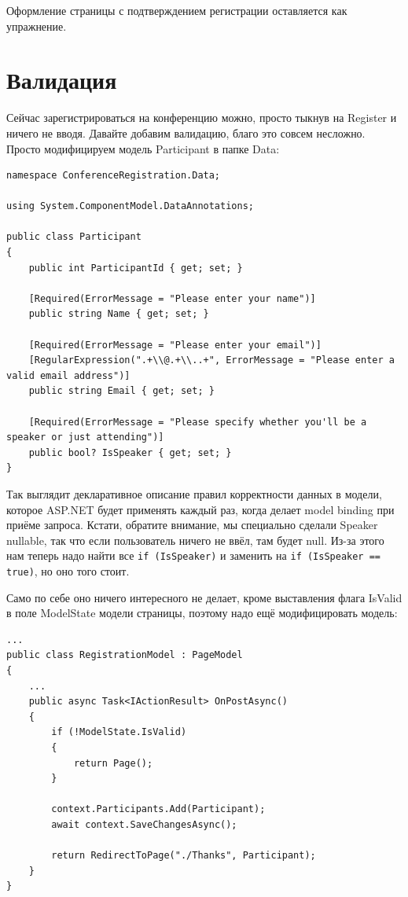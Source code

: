 \documentclass{../../text-style}
\begin{document}
Оформление страницы с подтверждением регистрации оставляется как упражнение.

\section{Валидация}

Сейчас зарегистрироваться на конференцию можно, просто тыкнув на Register и ничего не вводя. Давайте добавим валидацию, благо это совсем несложно. Просто модифицируем модель Participant в папке Data:

\begin{verbatim}
namespace ConferenceRegistration.Data;

using System.ComponentModel.DataAnnotations;

public class Participant
{
    public int ParticipantId { get; set; }

    [Required(ErrorMessage = "Please enter your name")]
    public string Name { get; set; }

    [Required(ErrorMessage = "Please enter your email")]
    [RegularExpression(".+\\@.+\\..+", ErrorMessage = "Please enter a valid email address")]
    public string Email { get; set; }

    [Required(ErrorMessage = "Please specify whether you'll be a speaker or just attending")]
    public bool? IsSpeaker { get; set; }
}
\end{verbatim}

Так выглядит декларативное описание правил корректности данных в модели, которое ASP.NET будет применять каждый раз, когда делает model binding при приёме запроса. Кстати, обратите внимание, мы специально сделали Speaker nullable, так что если пользователь ничего не ввёл, там будет null. Из-за этого нам теперь надо найти все \texttt{if (IsSpeaker)} и заменить на \texttt{if (IsSpeaker == true)}, но оно того стоит.

Само по себе оно ничего интересного не делает, кроме выставления флага IsValid в поле ModelState модели страницы, поэтому надо ещё модифицировать модель:

\begin{verbatim}
...
public class RegistrationModel : PageModel
{
    ...
    public async Task<IActionResult> OnPostAsync()
    {
        if (!ModelState.IsValid)
        {
            return Page();
        }

        context.Participants.Add(Participant);
        await context.SaveChangesAsync();

        return RedirectToPage("./Thanks", Participant);
    }
}
\end{verbatim}
\end{document}
